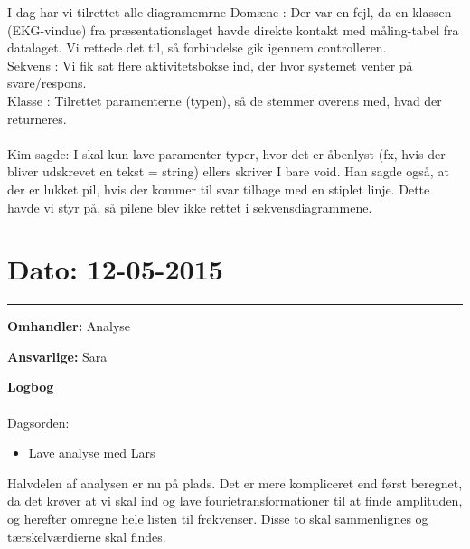 I dag har vi tilrettet alle diagramemrne
Domæne :  Der var en fejl, da en klassen (EKG-vindue) fra præsentationslaget havde direkte kontakt med måling-tabel fra datalaget. Vi rettede det til, så forbindelse gik igennem controlleren. 
\\
Sekvens : Vi fik sat flere aktivitetsbokse ind, der hvor systemet venter på svare/respons. 
\\
Klasse : Tilrettet paramenterne (typen), så de stemmer overens med, hvad der returneres. 
\\
\\
Kim sagde: I skal kun lave paramenter-typer, hvor det er åbenlyst (fx, hvis der bliver udskrevet en tekst = string) ellers skriver I bare void. 
Han sagde også, at der er lukket pil, hvis der kommer til svar tilbage med en stiplet linje. Dette havde vi styr på, så pilene blev ikke rettet i sekvensdiagrammene.  


\section{Dato: 12-05-2015}
\hrule
\textbf{Omhandler:} Analyse

\textbf{Ansvarlige:} Sara

\textbf{Logbog}
\\
\\
Dagsorden:
\begin{itemize}
	\item Lave analyse med Lars
\end{itemize}

Halvdelen af analysen er nu på plads. Det er mere kompliceret end først beregnet, da det krøver at vi skal ind og lave fourietransformationer til at finde amplituden, og herefter omregne hele listen til frekvenser. Disse to skal sammenlignes og tærskelværdierne skal findes. 
